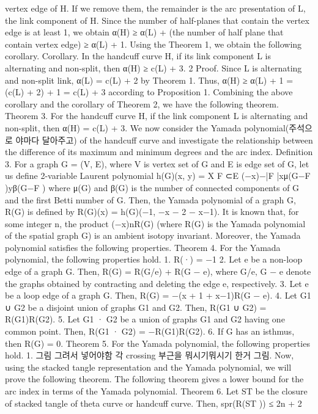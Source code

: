 vertex edge of H. If we remove them, the remainder is the arc presentation of L, the link component of H. Since
the number of half-planes that contain the vertex edge is at least 1, we obtain
α(H) ≥ α(L) + (the number of half plane that contain vertex edge) ≥ α(L) + 1.
Using the Theorem 1, we obtain the following corollary.
Corollary. In the handcuff curve H, if its link component L is alternating and non-split, then
α(H) ≥ c(L) + 3.
2
Proof. Since L is alternating and non-split link, α(L) = c(L) + 2 by Theorem 1. Thus,
α(H) ≥ α(L) + 1 = (c(L) + 2) + 1 = c(L) + 3
according to Proposition 1.
Combining the above corollary and the corollary of Theorem 2, we have the following theorem.
Theorem 3. For the handcuff curve H, if the link component L is alternating and non-split, then
α(H) = c(L) + 3.
We now consider the Yamada polynomial(주석으로 야마다 달아주고) of the handcuff curve and investigate the
relationship between the difference of its maximum and minimum degrees and the arc index.
Definition 3. For a graph G = (V, E), where V is vertex set of G and E is edge set of G, let us define 2-variable
Laurent polynomial
h(G)(x, y) = X
F ⊂E
(−x)−|F |xμ(G−F )yβ(G−F )
where μ(G) and β(G) is the number of connected components of G and the first Betti number of G.
Then, the Yamada polynomial of a graph G, R(G) is defined by
R(G)(x) = h(G)(−1, −x − 2 − x−1).
It is known that, for some integer n, the product (−x)nR(G) (where R(G) is the Yamada polynomial of the
spatial graph G) is an ambient isotopy invariant. Moreover, the Yamada polynomial satisfies the following properties.
Theorem 4. For the Yamada polynomial, the following properties hold.
1. R(·) = −1
2. Let e be a non-loop edge of a graph G. Then, R(G) = R(G/e) + R(G − e), where G/e, G − e denote the graphs
obtained by contracting and deleting the edge e, respectively.
3. Let e be a loop edge of a graph G. Then, R(G) = −(x + 1 + x−1)R(G − e).
4. Let G1 ∪ G2 be a disjoint union of graphs G1 and G2. Then, R(G1 ∪ G2) = R(G1)R(G2).
5. Let G1 · G2 be a union of graphs G1 and G2 having one common point. Then, R(G1 · G2) = −R(G1)R(G2).
6. If G has an isthmus, then R(G) = 0.
Theorem 5. For the Yamada polynomial, the following properties hold.
1. 그림 그려서 넣어야함 각 crossing 부근을 뭐시기뭐시기 한거 그림.
Now, using the stacked tangle representation and the Yamada polynomial, we will prove the following theorem.
The following theorem gives a lower bound for the arc index in terms of the Yamada polynomial.
Theorem 6. Let ST be the closure of stacked tangle of theta curve or handcuff curve. Then,
spr(R(ST )) ≤ 2n + 2
